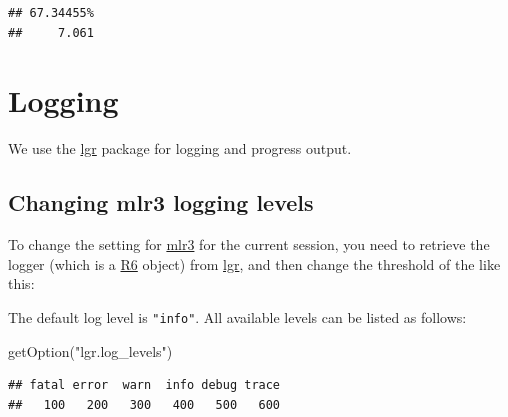 \documentclass[
]{scrbook}
\newenvironment{Shaded}{\begin{snugshade}}{\end{snugshade}}
\newcommand{\FunctionTok}[1]{\textcolor[rgb]{0.00,0.00,0.00}{#1}}
\newcommand{\NormalTok}[1]{#1}
\newcommand{\OtherTok}[1]{\textcolor[rgb]{0.56,0.35,0.01}{#1}}
\newcommand{\SpecialCharTok}[1]{\textcolor[rgb]{0.00,0.00,0.00}{#1}}
\newcommand{\StringTok}[1]{\textcolor[rgb]{0.31,0.60,0.02}{#1}}
\renewenvironment{Shaded} {\begin{snugshade}\small} {\end{snugshade}}
\begin{document}
\begin{verbatim}
## 67.34455% 
##     7.061
\end{verbatim}

\hypertarget{logging}{%
\section{Logging}\label{logging}}

We use the \href{https://cran.r-project.org/package=lgr}{lgr} package for logging and progress output.

\hypertarget{changing-mlr3-logging-levels}{%
\subsection{Changing mlr3 logging levels}\label{changing-mlr3-logging-levels}}

To change the setting for \href{https://mlr3.mlr-org.com}{mlr3} for the current session, you need to retrieve the logger (which is a \href{https://cran.r-project.org/package=R6}{R6} object) from \href{https://cran.r-project.org/package=lgr}{lgr}, and then change the threshold of the like this:

\begin{Shaded}
\end{Shaded}

The default log level is \texttt{"info"}.
All available levels can be listed as follows:

\begin{Shaded}
\begin{Highlighting}[]
\FunctionTok{getOption}\NormalTok{(}\StringTok{"lgr.log\_levels"}\NormalTok{)}
\end{Highlighting}
\end{Shaded}

\begin{verbatim}
## fatal error  warn  info debug trace 
##   100   200   300   400   500   600
\end{verbatim}
\end{document}
